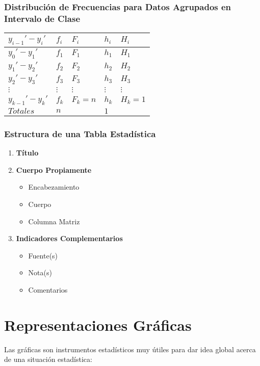 \subsubsection{Distribución de Frecuencias para Datos Agrupados en Intervalo de Clase}
\begin{center}
\begin{tabular}{|C{1.5cm}|C{1.5cm}|C{1.5cm}|C{1.5cm}|C{1.5cm}|}
\hline
$y_{i-1}'-y_i'$ & $f_i$ & $F_i$ & $h_i$ & $H_i$\\ \hline
$y_0'-y_1'$ & $f_1$ & $F_1$ & $h_1$ & $H_1$\\ \hline
$y_1'-y_2'$ & $f_2$ & $F_2$ & $h_2$ & $H_2$\\ \hline
$y_2'-y_3'$ & $f_3$ & $F_3$ & $h_3$ & $H_3$\\ \hline
$\vdots$ & $\vdots$ & $\vdots$ & $\vdots$ & $\vdots$ \\ \hline
$y_{k-1}'-y_k'$ & $f_k$ & $F_k=n$ & $h_k$ & $H_k=1$ \\ \hline
$Totales$ & $n$ &  & $1$ & \\ 
\hline
\end{tabular}
\end{center}
\subsubsection{Estructura de una Tabla Estadística}
\begin{enumerate}
\item \textbf{Título}
\item \textbf{Cuerpo Propiamente }
\begin{itemize}
\item Encabezamiento
\item Cuerpo
\item Columna Matriz
\end{itemize}
\item \textbf{Indicadores Complementarios}
\begin{itemize}
\item Fuente(s)
\item Nota(s)
\item Comentarios
\end{itemize}
\end{enumerate}
\section{Representaciones Gráficas}
Las gráficas son instrumentos estadísticos muy útiles para dar idea global acerca de una situación estadística:
